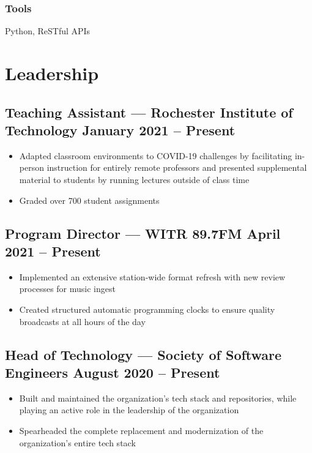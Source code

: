 \documentclass[11pt, letterpaper]{article}
\begin{document}
            \subsubsection{Tools}
                Python, ReSTful APIs

    \section{Leadership}
        \subsection{Teaching Assistant --- Rochester Institute of Technology \hfill January 2021 -- Present}
            \begin{itemize}[nosep]
                \item Adapted classroom environments to COVID-19 challenges by facilitating in-person
                    instruction for entirely remote professors and presented supplemental material to 
                    students by running lectures outside of class time
                \item Graded over 700 student assignments
            \end{itemize}

        \subsection{Program Director --- WITR 89.7FM \hfill April 2021 -- Present}
            \begin{itemize}[nosep]
                \item Implemented an extensive station-wide format refresh with new review processes for music ingest
                \item Created structured automatic programming clocks to ensure quality broadcasts at all 
                    hours of the day
            \end{itemize}

        \subsection{Head of Technology --- Society of Software Engineers \hfill August 2020 -- Present}
            \begin{itemize}[nosep]
                \item Built and maintained the organization's tech stack and repositories, while playing an active 
                    role in the \newline leadership of the organization 
                \item Spearheaded the complete replacement and modernization of the organization's entire tech 
                    stack
            \end{itemize}
\end{document}
